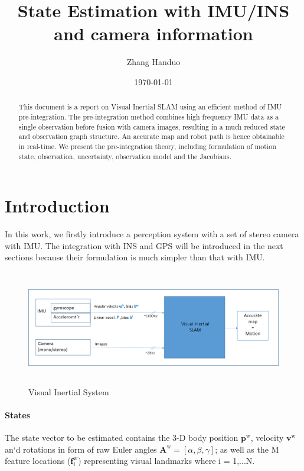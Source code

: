 \documentclass[12pt]{article}   %
\begin{document}


\title{State Estimation with IMU/INS and camera information}
\author{Zhang Handuo}
\date{\today}

\maketitle

\begin{abstract}
This document is a report on Visual Inertial SLAM using an efficient method of IMU pre-integration. The pre-integration method combines high frequency IMU data as a single observation before fusion with camera images, resulting in a much reduced state and observation graph structure. An accurate map and robot path is hence obtainable in real-time. We present the pre-integration theory, including formulation of motion state, observation, uncertainty, observation model and the Jacobians.
\end{abstract}

\newpage

\tableofcontents

\newpage

\section{Introduction}

\vspace{1cm}
In this work, we firstly introduce a perception system with a set of stereo camera with IMU. The integration with INS and GPS will be introduced in the next sections because their formulation is much simpler than that with IMU.
\begin{figure}[ht]
	\includegraphics[height=5cm]{figures/VIN_block-diagram.png}
	\caption{Visual Inertial System}
	\label{fig:vin}
\end{figure}

\paragraph{States}
The state vector to be estimated contains the 3-D body position $\bm{p}^{\mathrm{w}}$, velocity $\bm{v}^{\mathrm{w}}$ an`d rotations in form of %
raw Euler angles $\bm{A}^{\mathrm{w}}=[\alpha,\beta,\gamma]$; as well as the M feature locations ($\bm{f}_i^{\mathrm{w}}$) representing visual landmarks where i = 1,...N. 
\end{document}
